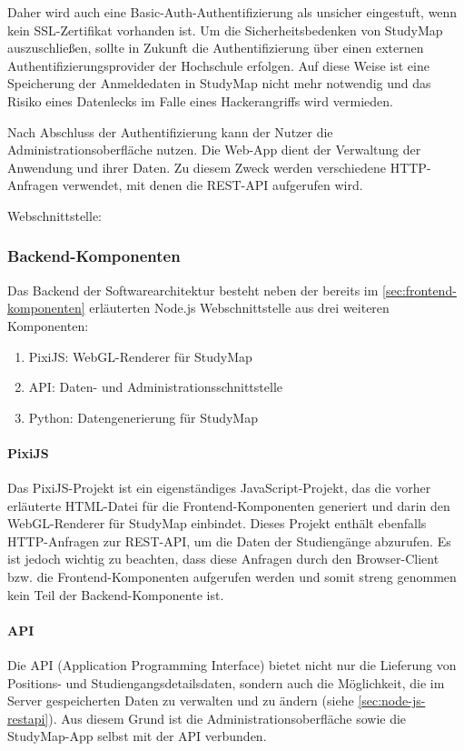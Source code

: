 Daher wird auch eine Basic-Auth-Authentifizierung als unsicher eingestuft, wenn kein SSL-Zertifikat vorhanden ist. Um die Sicherheitsbedenken von StudyMap auszuschließen, sollte in Zukunft die Authentifizierung über einen externen Authentifizierungsprovider der Hochschule erfolgen. Auf diese Weise ist eine Speicherung der Anmeldedaten in StudyMap nicht mehr notwendig und das Risiko eines Datenlecks im Falle eines Hackerangriffs wird vermieden.

Nach Abschluss der Authentifizierung kann der Nutzer die Administrationsoberfläche nutzen. Die Web-App dient der Verwaltung der Anwendung und ihrer Daten. Zu diesem Zweck werden verschiedene HTTP-Anfragen verwendet, mit denen die REST-API aufgerufen wird.

\noindent
Webschnittstelle: 

\subsubsection{Backend-Komponenten}
Das Backend der Softwarearchitektur besteht neben der bereits im \autoref{sec:frontend-komponenten} erläuterten Node.js Webschnittstelle aus drei weiteren Komponenten: \begin{enumerate}
    \item PixiJS: WebGL-Renderer für StudyMap
    \item API: Daten- und Administrationsschnittstelle
    \item Python: Datengenerierung für StudyMap
\end{enumerate}

\paragraph*{PixiJS}
Das PixiJS-Projekt ist ein eigenständiges JavaScript-Projekt, das die vorher erläuterte HTML-Datei  für die Frontend-Komponenten generiert und darin den WebGL-Renderer für StudyMap einbindet. Dieses Projekt enthält ebenfalls HTTP-Anfragen zur REST-API, um die Daten der Studiengänge abzurufen. Es ist jedoch wichtig zu beachten, dass diese Anfragen durch den Browser-Client bzw. die Frontend-Komponenten aufgerufen werden und somit streng genommen kein Teil der Backend-Komponente ist.

\paragraph*{API}
Die API (Application Programming Interface) bietet nicht nur die Lieferung von Positions- und Studiengangsdetailsdaten, sondern auch die Möglichkeit, die im Server gespeicherten Daten zu verwalten und zu ändern (siehe \autoref{sec:node-js-restapi}). Aus diesem Grund ist die Administrationsoberfläche sowie die StudyMap-App selbst mit der API verbunden.

